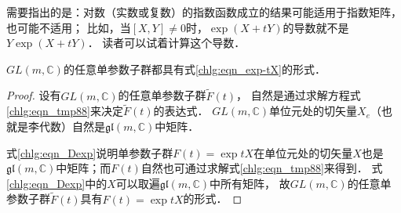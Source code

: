 需要指出的是：对数（实数或复数）的指数函数成立的结果可能适用于指数矩阵，也可能不适用；
比如，当$[X,Y]\neq 0$时，$\exp(X+tY)$的导数就不是$Y\exp(X+tY)$．
读者可以试着计算这个导数．


\begin{proposition}\label{chlg:thm_GL-expA}
    $GL(m,\mathbb{C})$的任意单参数子群都具有式\eqref{chlg:eqn_exp-tX}的形式．
\end{proposition}
\begin{proof}
设有$GL(m,\mathbb{C})$的任意单参数子群$\widetilde{F}(t)$，
自然是通过求解方程式\eqref{chlg:eqn_tmp88}来决定$\widetilde{F}(t)$的表达式．
$GL(m,\mathbb{C})$单位元处的切矢量$X_e$（也就是李代数）自然是$\mathfrak{gl}(m,\mathbb{C})$中矩阵．

式\eqref{chlg:eqn_Dexp}说明单参数子群$F(t)=\exp tX$在单位元处的切矢量$X$也是
$\mathfrak{gl}(m,\mathbb{C})$中矩阵；而$F(t)$自然也可通过求解式\eqref{chlg:eqn_tmp88}来得到．
式\eqref{chlg:eqn_Dexp}中的$X$可以取遍$\mathfrak{gl}(m,\mathbb{C})$中所有矩阵，
故$GL(m,\mathbb{C})$的任意单参数子群$\widetilde{F}(t)$具有$F(t)=\exp tX$的形式．
\end{proof}


